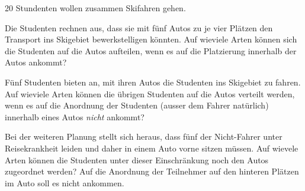 20 Stundenten wollen zusammen Skifahren gehen.
\begin{teilaufgaben}
\item
Die Studenten rechnen aus, dass sie mit fünf Autos zu je vier Plätzen
den Transport ins Skigebiet bewerkstelligen könnten.
Auf wieviele Arten können sich die Studenten auf die Autos
aufteilen, wenn es auf die Platzierung innerhalb der Autos
ankommt?
\item
Fünf Studenten bieten an, mit ihren Autos die Studenten ins Skigebiet
zu fahren.
Auf wieviele Arten können die übrigen Studenten auf die Autos verteilt werden,
wenn es auf die Anordnung der Studenten (ausser dem Fahrer natürlich)
innerhalb eines Autos {\em nicht} ankommt?
\item
Bei der weiteren Planung stellt sich heraus, dass fünf der Nicht-Fahrer
unter Reisekrankheit leiden und daher in einem Auto vorne sitzen
müssen.
Auf wievele Arten können die Studenten unter dieser Einschränkung noch
den Autos zugeordnet werden?
Auf die Anordnung der Teilnehmer auf den hinteren Plätzen im Auto
soll es nicht ankommen.
\end{teilaufgaben}


